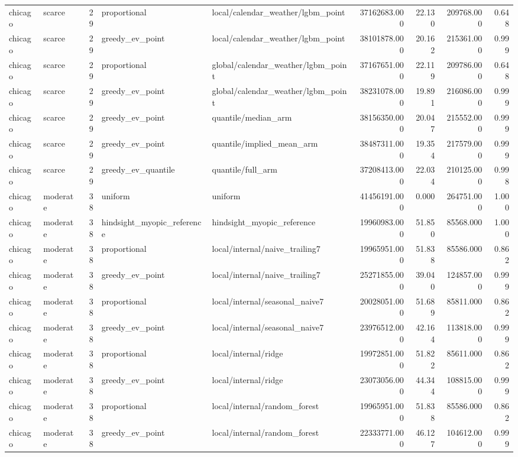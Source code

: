 \begin{tabular}{llrllrrrr}
chicago & scarce & 29 & proportional & local/calendar\_weather/lgbm\_point & 37162683.000 & 22.130 & 209768.000 & 0.648 \\
chicago & scarce & 29 & greedy\_ev\_point & local/calendar\_weather/lgbm\_point & 38101878.000 & 20.162 & 215361.000 & 0.999 \\
chicago & scarce & 29 & proportional & global/calendar\_weather/lgbm\_point & 37167651.000 & 22.119 & 209786.000 & 0.648 \\
chicago & scarce & 29 & greedy\_ev\_point & global/calendar\_weather/lgbm\_point & 38231078.000 & 19.891 & 216086.000 & 0.999 \\
chicago & scarce & 29 & greedy\_ev\_point & quantile/median\_arm & 38156350.000 & 20.047 & 215552.000 & 0.999 \\
chicago & scarce & 29 & greedy\_ev\_point & quantile/implied\_mean\_arm & 38487311.000 & 19.354 & 217579.000 & 0.999 \\
chicago & scarce & 29 & greedy\_ev\_quantile & quantile/full\_arm & 37208413.000 & 22.034 & 210125.000 & 0.998 \\
chicago & moderate & 38 & uniform & uniform & 41456191.000 & 0.000 & 264751.000 & 1.000 \\
chicago & moderate & 38 & hindsight\_myopic\_reference & hindsight\_myopic\_reference & 19960983.000 & 51.850 & 85568.000 & 1.000 \\
chicago & moderate & 38 & proportional & local/internal/naive\_trailing7 & 19965951.000 & 51.838 & 85586.000 & 0.862 \\
chicago & moderate & 38 & greedy\_ev\_point & local/internal/naive\_trailing7 & 25271855.000 & 39.040 & 124857.000 & 0.999 \\
chicago & moderate & 38 & proportional & local/internal/seasonal\_naive7 & 20028051.000 & 51.689 & 85811.000 & 0.862 \\
chicago & moderate & 38 & greedy\_ev\_point & local/internal/seasonal\_naive7 & 23976512.000 & 42.164 & 113818.000 & 0.999 \\
chicago & moderate & 38 & proportional & local/internal/ridge & 19972851.000 & 51.822 & 85611.000 & 0.862 \\
chicago & moderate & 38 & greedy\_ev\_point & local/internal/ridge & 23073056.000 & 44.344 & 108815.000 & 0.999 \\
chicago & moderate & 38 & proportional & local/internal/random\_forest & 19965951.000 & 51.838 & 85586.000 & 0.862 \\
chicago & moderate & 38 & greedy\_ev\_point & local/internal/random\_forest & 22333771.000 & 46.127 & 104612.000 & 0.999 \\

\end{tabular}
